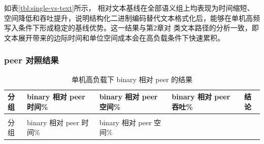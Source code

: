 如表\ref{tbl:single-vs-text}所示， 相对文本基线在全部语义组上均表现为时间缩短、空间降低和吞吐提升，说明结构化二进制编码替代文本格式化后，能够在单机高频写入条件下形成稳定的基线优势。这一结果与第2章对  类文本路径的分析一致，即文本展开带来的边际时间和单位空间成本会在高负载条件下快速累积。

\subsubsection{peer 对照结果}\label{peer-ux5bf9ux7167ux7ed3ux679c}

\begin{longtable}[]{@{}
  >{\centering\arraybackslash}p{}
  >{\centering\arraybackslash}p{}
  >{\centering\arraybackslash}p{}
  >{\centering\arraybackslash}p{}
  >{\raggedright\arraybackslash}p{}@{}}
\caption{单机高负载下 binary 相对 peer 的结果}\label{tbl:single-vs-peer}\tabularnewline
\toprule\noalign{}
\begin{minipage}[t]{\hsize}\centering
分组
\end{minipage} & \begin{minipage}[t]{\hsize}\centering
binary 相对 peer 时间\%
\end{minipage} & \begin{minipage}[t]{\hsize}\centering
binary 相对 peer 空间\%
\end{minipage} & \begin{minipage}[t]{\hsize}\centering
binary 相对 peer 吞吐\%
\end{minipage} & \begin{minipage}[t]{\hsize}\centering
结论
\end{minipage} \\
\midrule\noalign{}
\endfirsthead
\multicolumn{5}{r}{（续表\thetable）} \\
\toprule\noalign{}
\begin{minipage}[t]{\hsize}\centering
分组
\end{minipage} & \begin{minipage}[t]{\hsize}\centering
binary 相对 peer 时间\%
\end{minipage} & \begin{minipage}[t]{\hsize}\centering
binary 相对 peer 空间\%
\end{minipage} & \begin{minipage}[t]{\hsize}\centering

\end{minipage}
\end{longtable}
